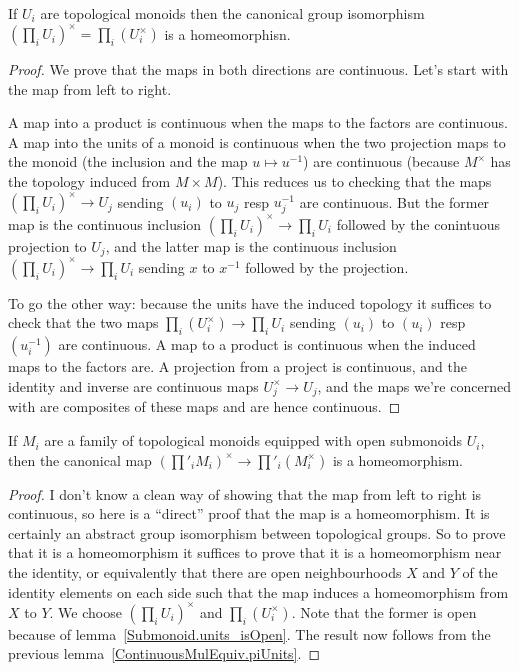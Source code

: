 \begin{lemma}
  \label{ContinuousMulEquiv.piUnits}
  \leanok
  If $U_i$ are topological monoids then the canonical
  group isomorphism $(\prod_i U_i)^\times=\prod_i(U_i^\times)$ is a homeomorphisn.
\end{lemma}
\begin{proof} We prove that the maps in both directions are continuous. Let's start
  with the map from left to right.

  A map into a product is continuous when the maps to the factors
  are continuous. A map into the units of a monoid is continuous when the
  two projection maps to the monoid (the inclusion and the map $u\mapsto u^{-1}$)
  are continuous (because $M^\times$ has the topology induced from $M\times M$).
  This reduces us to checking that the maps $(\prod_i U_i)^\times\to U_j$
  sending $(u_i)$ to $u_j$ resp $u_j^{-1}$ are continuous. But the former map
  is the continuous inclusion $(\prod_i U_i)^\times\to\prod_i U_i$ followed
  by the conintuous projection to $U_j$, and the latter map is the continuous
  inclusion $(\prod_i U_i)^\times\to\prod_i U_i$ sending $x$ to $x^{-1}$
  followed by the projection.

  To go the other way: because the units have the induced topology it suffices
  to check that the two maps $\prod_i(U_i^\times)\to\prod_i U_i$
  sending $(u_i)$ to $(u_i)$ resp $(u_i^{-1})$ are continuous. A map
  to a product is continuous when the induced maps to the factors are.
  A projection from a project is continuous, and the identity and inverse are
  continuous maps $U_j^\times\to U_j$, and the maps we're concerned with are composites
  of these maps and are hence continuous.
\end{proof}

\begin{theorem}
  \label{ContinuousMulEquiv.restrictedProductUnits}
  \leanok
  If $M_i$ are a family of topological monoids equipped with open
  submonoids $U_i$, then the canonical map $(\prod'_iM_i)^\times\to\prod'_i(M_i^\times)$
  is a homeomorphism.
\end{theorem}
\begin{proof}
  I don't know a clean way of showing that the map from left to right is continuous,
  so here is a ``direct'' proof that the map is a homeomorphism. It is certainly an abstract group
  isomorphism between topological groups. So to prove that it is a homeomorphism it suffices
  to prove that it is a homeomorphism near the identity, or equivalently that there are open
  neighbourhoods $X$ and $Y$ of the identity elements on each side such that the map induces a
  homeomorphism from $X$ to $Y$. We choose $(\prod_i U_i)^\times$ and $\prod_i (U_i^\times)$.
  Note that the former is open because of lemma~\ref{Submonoid.units_isOpen}.
  The result now follows from the previous lemma~\ref{ContinuousMulEquiv.piUnits}.
\end{proof}

